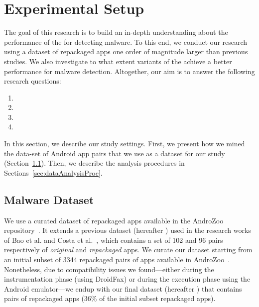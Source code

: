 \section{Experimental Setup}\label{sec:experimentalSetup}

The goal of this research is to build an in-depth understanding about
the performance of the \mas for detecting malware. To this
end, we conduct our research using a dataset of repackaged apps one order of magnitude
larger than previous studies. We also investigate to what
extent variants of the \mas achieve a better performance
for malware detection. Altogether, our
aim is to answer the following research questions:

\begin{enumerate}[(RQ1)]
\item \rqa
\item \rqb
\item \rqc
\item \rqd  
\end{enumerate}

In this section, we describe our study settings. First, we present how we mined the data-set of Android app pairs that we
use as a dataset for our study (Section~\ref{sec:dataset}).  Then, we describe the analysis procedures in Sections~\ref{sec:dataAnalysisProc}.


\subsection{Malware Dataset}\label{sec:dataset}

We use a curated dataset of \apps repackaged apps available in the AndroZoo repository~\cite{DBLP:conf/msr/AllixBKT16}.
It extends a previous dataset (hereafter \sds) used in the research works of Bao et al. and Costa et al.~\cite{DBLP:conf/wcre/BaoLL18,DBLP:conf/scam/CostaMCMVBC20},
which contains a set of 102 and 96 pairs respectively of \emph{original} and \emph{repackaged} apps.
We curate our dataset starting from an initial subset of 3344 repackaged pairs of apps available in AndroZoo~\cite{DBLP:conf/msr/AllixBKT16}.
Nonetheless, due to compatibility issues we found---either during the instrumentation phase (using DroidFax) or during the execution
phase using the Android emulator---we endup with our final dataset (hereafter \cds) that contains \apps pairs of
repackaged apps (36\% of the initial subset repackaged apps).

